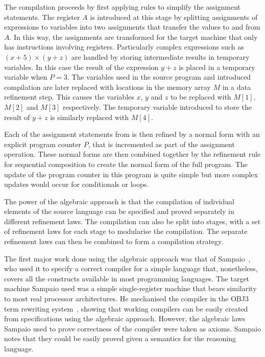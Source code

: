 \documentclass[a4paper,10pt]{report}
\begin{document}
The compilation proceeds by first applying rules to simplify the
assignment statements.
The register $A$ is introduced at this stage by splitting assignments
of expressions to variables into two assignments that transfer the
values to and from $A$.
In this way, the assignments are transformed for the target machine
that only has instructions involving registers.
Particularly complex expressions such as $(x + 5) \times (y + z)$ are
handled by storing intermediate results in temporary variables.
In this case the result of the expression $y + z$ is placed in a
temporary variable when $P = 3$.
The variables used in the source program and introduced compilation
are later replaced with locations in the memory array $M$ in a data
refinement step.
This causes the variables $x$, $y$ and $z$ to be replaced with $M[1]$,
$M[2]$ and $M[3]$ respectively.
The temporary variable introduced to store the result of $y + z$ is
similarly replaced with $M[4]$.

Each of the assignment statements from is then refined by a normal
form with an explicit program counter $P$, that is incremented as part
of the assignment operation.
These normal forms are then combined together by the refinement rule
for sequential composition to create the normal form of the full
program.
The update of the program counter in this program is quite simple but
more complex updates would occur for conditionals or loops.

The power of the algebraic approach is that the compilation of
individual elements of the source language can be specified and proved
separately in different refinement laws.
The compilation can also be split into stages, with a set of
refinement laws for each stage to modularise the compilation.
The separate refinement laws can then be combined to form a
compilation strategy.

The first major work done using the algebraic approach was that of
Sampaio~\cite{sampaio1993}, who used it to specify a correct compiler
for a simple language that, nonetheless, covers all the constructs
available in most programming languages.
The target machine Sampaio used was a simple single-register machine
that bears similarity to most real processor architectures.
He mechanised the compiler in the OBJ3 term rewriting
system~\cite{goguen1988}, showing that working compilers can be easily
created from specifications using the algebraic approach.
However, the algebraic laws Sampaio used to prove correctness of the
compiler were taken as axioms.
Sampaio notes that they could be easily proved given a semantics for
the reasoning language.
\end{document}
